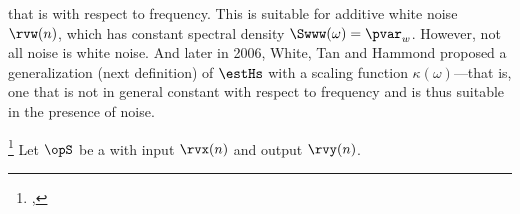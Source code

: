 that is  with respect to frequency.
This is suitable for additive white noise $\rvw(n)$, which has constant spectral density
$\Swww(\omega)=\pvar_w$.
However, not all noise is white noise.
And later in 2006, White, Tan and Hammond proposed a generalization (next definition) of $\estHs$ with a scaling
function $\kappa(\omega)$---that is, one that is not in general constant with respect to frequency
and is thus suitable in the presence of  noise.
\begin{definition}                                                                   %
\footnote{                                                                           %
  ,                                                     %
  }                                                                                  %
\label{def:Hkp}                                                                      %
Let $\opS$ be a  with input $\rvx(n)$ and output $\rvy(n)$.
\end{definition}


